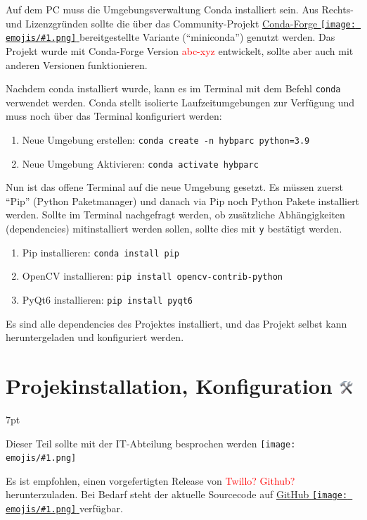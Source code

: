 \documentclass[a4paper, 10pt]{article}
\newcommand{\warn}[1]{\textcolor{red}{#1}}
\newcommand{\code}[1]{\texttt{#1}}
\newcommand{\emoji}[1]{
    \begingroup\normalfont
    \texttt{[image: emojis/\#1.png]}
    \endgroup
}
\newenvironment{formal}{%
    \def\FrameCommand{%
    \hspace{1pt}%
    {\color{formalpipe}\vrule width 0.7mm}%
    {\color{formalshade}\vrule width 1.5mm}%
    \colorbox{formalshade}%
    }%
    \MakeFramed{\advance\hsize-\width\FrameRestore}%
    \noindent%
    \begin{adjustwidth}{}{7pt}%
    \vspace{2pt}\vspace{2pt}%
}
{%
    \vspace{2pt}\end{adjustwidth}\endMakeFramed%
}
\begin{document}
Auf dem PC muss die Umgebungsverwaltung Conda installiert sein. Aus Rechts- und Lizenzgründen sollte die über das Community-Projekt \href{https://conda-forge.org/}{Conda-Forge\emoji{link}} bereitgestellte Variante (\enquote{miniconda}) genutzt werden. Das Projekt wurde mit Conda-Forge Version \warn{abc-xyz} entwickelt, sollte aber auch mit anderen Versionen funktionieren.

Nachdem conda installiert wurde, kann es im Terminal mit dem Befehl \code{conda} verwendet werden. Conda stellt isolierte Laufzeitumgebungen zur Verfügung und muss noch über das Terminal konfiguriert werden:
\begin{enumerate}
    \item Neue Umgebung erstellen: \code{conda create -n hybparc python=3.9}
    \item Neue Umgebung Aktivieren: \code{conda activate hybparc}
\end{enumerate}

Nun ist das offene Terminal auf die neue Umgebung gesetzt. Es müssen zuerst \enquote{Pip} (Python Paketmanager) und danach via Pip noch Python Pakete installiert werden. Sollte im Terminal nachgefragt werden, ob zusätzliche Abhängigkeiten (dependencies) mitinstalliert werden sollen, sollte dies mit \code{y} bestätigt werden.

\begin{enumerate}
    \item Pip installieren: \code{conda install pip}
    \item OpenCV installieren: \code{pip install opencv-contrib-python}
    \item PyQt6 installieren: \code{pip install pyqt6}
\end{enumerate}

Es sind alle dependencies des Projektes installiert, und das Projekt selbst kann heruntergeladen und konfiguriert werden.


\section{Projekinstallation, Konfiguration \includegraphics[height=0.65em]{emojis/hammer-and-wrench.png}}
\label{sec:installation-configuration}
\begin{formal}
    Dieser Teil sollte mit der IT-Abteilung besprochen werden\emoji{technologist}
\end{formal}
Es ist empfohlen, einen vorgefertigten Release von \warn{Twillo? Github?} herunterzuladen. Bei Bedarf steht der aktuelle Sourcecode auf \href{https://github.com/leloomi/hybparc_aruco}{GitHub\emoji{link}} verfügbar.
\end{document}
